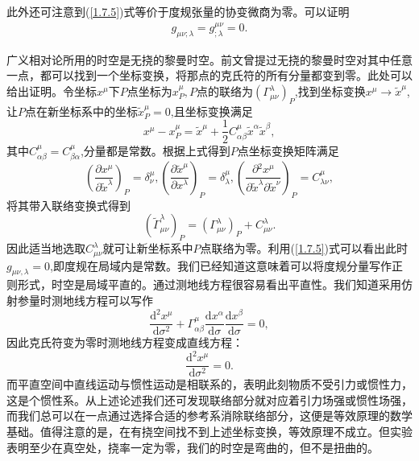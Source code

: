 \documentclass[11pt, a4paper, oneside, onecolumn]{ctexart}
\numberwithin{equation}{subsection}
\begin{document}
此外还可注意到(\ref{1.7.5})式等价于度规张量的协变微商为零。可以证明
\begin{align}
g_{\mu\nu;\lambda}=g^{\mu\nu}_{;\lambda}=0.
\end{align}

广义相对论所用的时空是无挠的黎曼时空。前文曾提过无挠的黎曼时空对其中任意一点，都可以找到一个坐标变换，将那点的克氏符的所有分量都变到零。此处可以给出证明。令坐标$x^{\mu}$下$P$点坐标为$x^{\mu}_{P},P$点的联络为$\left(\Gamma^{\lambda}_{\mu\nu}\right)_{P}$,找到坐标变换$x^{\mu}\to\widetilde{x}^{\mu}$,让$P$点在新坐标系中的坐标$\widetilde{x}^{\mu}_{P}=0$,且坐标变换满足
\begin{equation}
x^{\mu}-x^{\mu}_{P}=\widetilde{x}^{\mu}+\frac{1}{2}C_{\alpha\beta}^{\mu}\widetilde{x}^{\alpha}\widetilde{x}^{\beta},
\end{equation}
其中$C_{\alpha\beta}^{\mu}=C_{\beta\alpha}^{\mu}$,分量都是常数。根据上式得到$P$点坐标变换矩阵满足
\begin{equation}
\left(\frac{\partial{}x^{\mu}}{\partial{}\widetilde{x}^{\lambda}}\right)_{P}=\delta{}^{\mu}_{\nu},\left(\frac{\partial{}\widetilde{x}^{\mu}}{\partial{}x^{\lambda}}\right)_{P}=\delta{}^{\mu}_{\lambda},\left(\frac{\partial{}^{2}x^{\mu}}{\partial{}\widetilde{x}^{\lambda}\partial{}\widetilde{x}^{\nu}}\right)_{P}=C_{\lambda\nu}^{\mu},
\end{equation}
将其带入联络变换式得到
\begin{equation}
\left(\widetilde{\Gamma}^{\lambda}_{\mu\nu}\right)_{P}=\left(\Gamma^{\lambda}_{\mu\nu}\right)_{P}+C_{\mu\nu}^{\lambda}.
\end{equation}
因此适当地选取$C_{\mu\nu}^{\lambda}$就可让新坐标系中$P$点联络为零。利用(\ref{1.7.5})式可以看出此时$g_{\mu\nu,\lambda}=0$,即度规在局域内是常数。我们已经知道这意味着可以将度规分量写作正则形式，时空是局域平直的。通过测地线方程很容易看出平直性。我们知道采用仿射参量时测地线方程可以写作
\begin{equation}
\frac{\mathrm{d}^{2}x^{\mu}}{\mathrm{d}\sigma^{2}}+\Gamma_{\alpha\beta}^{\mu}\frac{\mathrm{d}x^{\alpha}}{\mathrm{d}\sigma}\frac{\mathrm{d}x^{\beta}}{\mathrm{d}\sigma}=0,\tag{1.4.13}
\end{equation}
因此克氏符变为零时测地线方程变成直线方程：
\begin{equation}
\frac{\mathrm{d}^{2}x^{\mu}}{\mathrm{d}\sigma^{2}}=0.
\end{equation}
而平直空间中直线运动与惯性运动是相联系的，表明此刻物质不受引力或惯性力，这是个惯性系。从上述论述我们还可发现联络部分就对应着引力场强或惯性场强，而我们总可以在一点通过选择合适的参考系消除联络部分，这便是等效原理的数学基础。值得注意的是，在有挠空间找不到上述坐标变换，等效原理不成立。但实验表明至少在真空处，挠率一定为零，我们的时空是弯曲的，但不是扭曲的。
\end{document}
